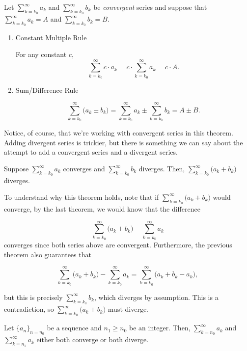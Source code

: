 \documentclass{ximera}
\begin{document}
\begin{theorem}
  Let  $\sum\limits_{k=k_0}^\infty a_k$ and  $\sum\limits_{k=k_0}^\infty b_k$ be \emph{convergent} series and suppose that $
  \sum\limits_{k=k_0}^\infty a_k = A$ and $\sum\limits_{k=k_0}^\infty b_k =B.$
 
 \begin{enumerate}
\item Constant Multiple Rule 

For any constant $c$, \[\sum\limits_{k=k_0}^\infty c\cdot a_k =
  c\cdot\sum\limits_{k=k_0}^\infty a_k = c\cdot A.\]
\item Sum/Difference Rule 

\[\sum\limits_{k=k_0}^\infty \big(a_k\pm b_k\big) =
  \sum\limits_{k=k_0}^\infty a_k \pm \sum\limits_{k=k_0}^\infty b_k = A \pm B.\]
\end{enumerate} 
\end{theorem}


Notice, of course, that we're working with convergent series in this 
theorem.  Adding divergent series is trickier, but there is something we can say about the attempt to add a convergent series and a divergent series.

\begin{theorem}
 Suppose $\sum\limits_{k=k_0}^\infty a_k$ converges and  $\sum\limits_{k=k_0}^\infty b_k$ diverges.  Then, $\sum\limits_{k=k_0}^{\infty} \big(a_k+b_k\big)$ diverges.
\end{theorem}

To understand why this theorem holds, note that if $\sum\limits_{k=k_0}^\infty \big(a_k+b_k\big)$ would converge, by the last theorem, we would know that the difference

\[\sum\limits_{k=k_0}^\infty \big(a_k+b_k\big) -\sum\limits_{k=k_0}^\infty a_k\]
converges since both series above are convergent.  Furthermore, the previous theorem also guarantees that

\[\sum\limits_{k=k_0}^\infty \big(a_k+b_k\big) -\sum\limits_{k=k_0}^\infty a_k = \sum\limits_{k=k_0}^\infty \big(a_k+b_k -a_k\big),\]

but this is precisely $\sum\limits_{k=k_0}^{\infty} b_k$, which diverges by assumption.  This is a contradiction, so  $\sum\limits_{k=k_0}^\infty \big(a_k+b_k\big)$ must diverge.


\begin{theorem}
  Let $\{a_n\}_{n=n_0}$ be a sequence and $n_1 \geq n_0$ be an integer.  Then, $\sum\limits_{k=n_0}^{\infty} a_k$ and $\sum\limits_{k=n_1}^{\infty} a_k$ either both converge or both diverge.
\end{theorem}
\end{document}
